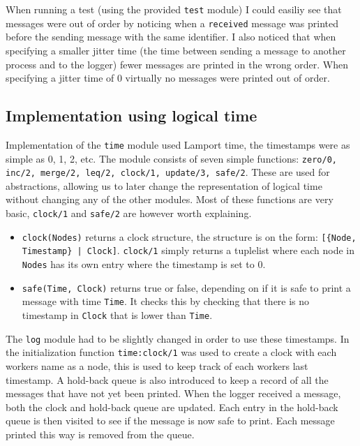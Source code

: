 \documentclass[a4paper, 11pt]{article}
\begin{document}
When running a test (using the provided \texttt{test} module) I could easiliy see that messages were out of order by noticing when a \texttt{received} message was printed before the {sending} message with the same identifier. I also noticed that when specifying a smaller jitter time (the time between sending a message to another process and to the logger) fewer messages are printed in the wrong order. When specifying a jitter time of 0 virtually no messages were printed out of order.

\subsection{Implementation using logical time}

Implementation of the \texttt{time} module used Lamport time, the timestamps were as simple as 0, 1, 2, etc. The module consists of seven simple functions: \texttt{zero/0, inc/2, merge/2, leq/2, clock/1, update/3, safe/2}. These are used for abstractions, allowing us to later change the representation of logical time without changing any of the other modules. Most of these functions are very basic, \texttt{clock/1} and \texttt{safe/2} are however worth explaining.

\begin{itemize}

\item \texttt{clock(Nodes)} returns a clock structure, the structure is on the form: \texttt{[\{Node, Timestamp\} | Clock]}. \texttt{clock/1} simply returns a tuplelist where each node in \texttt{Nodes} has its own entry where the timestamp is set to 0.

\item \texttt{safe(Time, Clock)} returns true or false, depending on if it is safe to print a message with time \texttt{Time}. It checks this by checking that there is no timestamp in \texttt{Clock} that is lower than \texttt{Time}.

\end{itemize}

The \texttt{log} module had to be slightly changed in order to use these timestamps. In the initialization function \texttt{time:clock/1} was used to create a clock with each workers name as a node, this is used to keep track of each workers last timestamp. A hold-back queue is also introduced to keep a record of all the messages that have not yet been printed. When the logger received a message, both the clock and hold-back queue are updated. Each entry in the hold-back queue is then visited to see if the message is now safe to print. Each message printed this way is removed from the queue.
\end{document}

